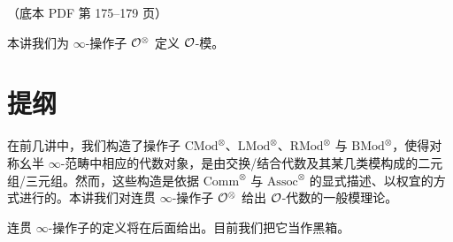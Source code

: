 \begin{center}\small\color{black!55}（底本 PDF 第 175–179 页）\end{center}

本讲我们为 $\infty$-操作子 $\mathcal{O}^{\otimes}$ 定义 $\mathcal{O}$-模。

\section{提纲}

\nitem\label{L23-1.1} 在前几讲中，我们构造了操作子 $\mathrm{CMod}^{\otimes}$、$\mathrm{LMod}^{\otimes}$、$\mathrm{RMod}^{\otimes}$ 与 $\mathrm{BMod}^{\otimes}$，使得对称幺半 $\infty$-范畴中相应的代数对象，是由交换/结合代数及其某几类模构成的二元组/三元组。然而，这些构造是依据 $\mathrm{Comm}^{\otimes}$ 与 $\mathrm{Assoc}^{\otimes}$ 的显式描述、以权宜的方式进行的。本讲我们对连贯 $\infty$-操作子 $\mathcal{O}^{\otimes}$ 给出 $\mathcal{O}$-代数的一般模理论。

\nitem\label{L23-1.2} 连贯 $\infty$-操作子的定义将在后面给出。目前我们把它当作黑箱。


